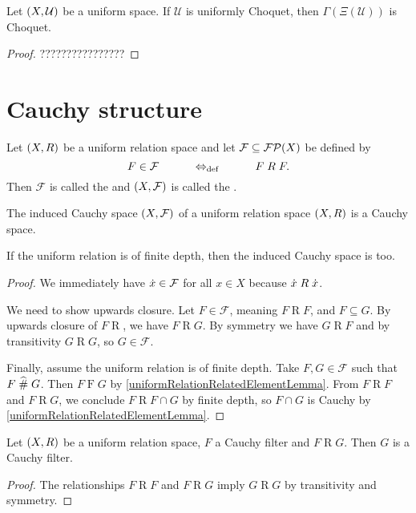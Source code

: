 \begin{lemma}
Let $\left( X,\mathcal{U} \right)$ be a uniform space. If $\mathcal{U}$ is uniformly Choquet, then $\Gamma(\Xi(\mathcal{U}))$ is Choquet.
\end{lemma}
\begin{proof}
????????????????
\end{proof}


\section{Cauchy structure}
\begin{definition}
Let $\left( X,R \right)$ be a uniform relation space and let $\mathcal{F}\subseteq \operatorname{\mathcal{FP}}(X)$ be defined by
\[ F\in \mathcal{F} \qquad\quad\Leftrightarrow_{\text{def}}\quad\qquad F\mathrel{R} F. \]
Then $\mathcal{F}$ is called the  and $\left( X,\mathcal{F} \right)$ is called the .
\end{definition}
\begin{lemma}
The induced Cauchy space $\left( X, \mathcal{F} \right)$ of a uniform relation space $\left( X,R \right)$ is a Cauchy space.

If the uniform relation is of finite depth, then the induced Cauchy space is too.
\end{lemma}
\begin{proof}
We immediately have $\dot{x}\in\mathcal{F}$ for all $x\in X$ because $\dot{x}\mathrel{R} \dot{x}$.

We need to show upwards closure. Let $F\in \mathcal{F}$, meaning $F\mathrel{R} F$, and $F\subseteq G$. By upwards closure of $F\mathrel{R}$, we have $F\mathrel{R} G$. By symmetry we have $G\mathrel{R} F$ and by transitivity $G\mathrel{R} G$, so $G\in\mathcal{F}$.

Finally, assume the uniform relation is of finite depth. Take $F,G\in \mathcal{F}$ such that $F\mathrel{\widehat{\#}} G$. Then $F\mathrel{F}G$ by \ref{uniformRelationRelatedElementLemma}.
From $F\mathrel{R}F$ and $F\mathrel{R}G$, we conclude $F\mathrel{R}F\cap G$ by finite depth, so $F\cap G$ is Cauchy by \ref{uniformRelationRelatedElementLemma}.
\end{proof}

\begin{lemma}
Let $\left( X, R \right)$ be a uniform relation space, $F$ a Cauchy filter and $F\mathrel{R} G$. Then $G$ is a Cauchy filter.
\end{lemma}
\begin{proof}
The relationships $F\mathrel{R} F$ and $F\mathrel{R} G$ imply $G\mathrel{R} G$ by transitivity and symmetry.
\end{proof}

